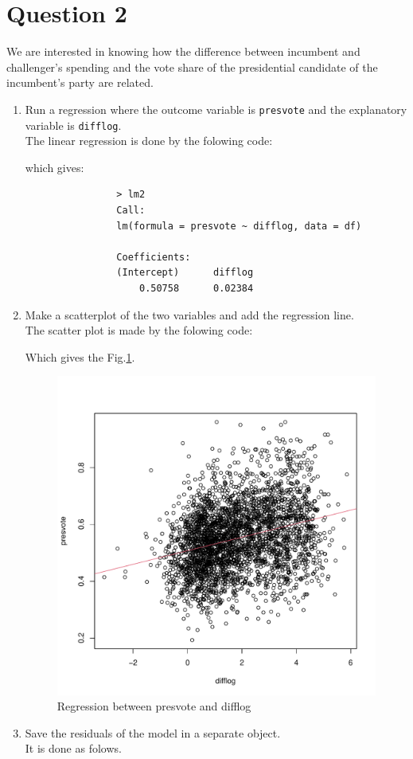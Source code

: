 \documentclass[12pt,letterpaper]{article}
\begin{document}
\newpage

\section*{Question 2}
\noindent We are interested in knowing how the difference between incumbent and challenger's spending and the vote share of the presidential candidate of the incumbent's party are related.	\vspace{.25cm}
	\begin{enumerate}
		\item Run a regression where the outcome variable is \texttt{presvote} and the explanatory variable is \texttt{difflog}. \\
			The linear regression is done by the folowing code:
			  
			which gives:
			\begin{verbatim}
				> lm2
				Call:
				lm(formula = presvote ~ difflog, data = df)
				
				Coefficients:
				(Intercept)      difflog  
				    0.50758      0.02384 
			\end{verbatim}

		\item Make a scatterplot of the two variables and add the regression line. \\
			The scatter plot is made by the folowing code:
			  
			Which gives the Fig.\ref{fig:lm_2}. \\
				
			\begin{figure}[h!]\centering
				\caption{\footnotesize Regression between presvote and difflog}
				\label{fig:lm_2}
				\includegraphics[width=.85\textwidth]{lm2.pdf}
			\end{figure}
		\item Save the residuals of the model in a separate object.\\
			It is done as folows.\\
			

\end{enumerate}
\end{document}
